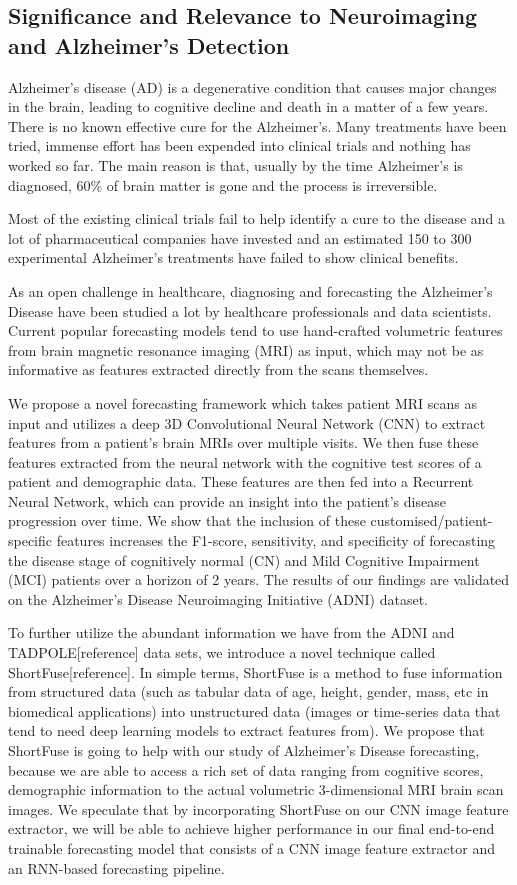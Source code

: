 \documentclass[12pt]{article}
\begin{document}
\subsection{Significance and Relevance to Neuroimaging and Alzheimer's Detection}

Alzheimer’s disease (AD)  is a degenerative condition that causes major changes in the brain, leading to cognitive decline and death in a matter of a few years. There is no known effective cure for the Alzheimer's. Many treatments have been tried, immense effort has been expended into clinical trials and nothing has worked so far. The main reason is that, usually by the time Alzheimer's is diagnosed, 60\% of brain matter is gone and the process is irreversible.

Most of the existing clinical trials fail to help identify a cure to the disease and a lot of pharmaceutical companies have invested and an estimated 150 to 300 experimental Alzheimer's treatments have failed to show clinical benefits. 

As an open challenge in healthcare, diagnosing and forecasting the Alzheimer's Disease have been studied a lot by healthcare professionals and data scientists. Current popular forecasting models tend to use hand-crafted volumetric features from brain magnetic resonance imaging (MRI) as input, which may not be as informative as features extracted directly from the scans themselves. 

We propose a novel forecasting framework which takes patient MRI scans as input and utilizes a deep 3D Convolutional Neural Network (CNN) to extract features from a patient’s brain MRIs over multiple visits. We then fuse these features extracted from the neural network with the cognitive test scores of a patient and demographic data. These features are then fed into a Recurrent Neural Network, which can provide an insight into the patient’s disease progression over time. We show that the inclusion of these customised/patient-specific features increases the F1-score, sensitivity, and specificity of forecasting the disease stage of cognitively normal (CN) and Mild Cognitive Impairment (MCI) patients over a horizon of 2 years. The results of our findings are validated on the Alzheimer’s Disease Neuroimaging Initiative (ADNI) dataset.

To further utilize the abundant information we have from the ADNI and TADPOLE[reference] data sets, we introduce a novel technique called ShortFuse[reference]. In simple terms, ShortFuse is a method to fuse information from structured data (such as tabular data of age, height, gender, mass, etc in biomedical applications) into unstructured data (images or time-series data that tend to need deep learning models to extract features from). We propose that ShortFuse is going to help with our study of Alzheimer's Disease forecasting, because we are able to access a rich set of data ranging from cognitive scores, demographic information to the actual volumetric 3-dimensional MRI brain scan images. We speculate that by incorporating ShortFuse on our CNN image feature extractor, we will be able to achieve higher performance in our final end-to-end trainable forecasting model that consists of a CNN image feature extractor and an RNN-based forecasting pipeline. 
\end{document}
